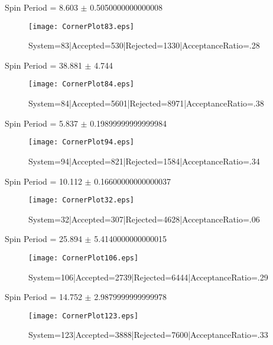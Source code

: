 \documentclass[10pt]{article}
\begin{document}
\begin{center}
        Spin Period = 8.603 $\pm$ 0.5050000000000008
        \end{center}
\begin{figure}[h] 
        \texttt{[image: CornerPlot83.eps]}
        \caption{System=83|Accepted=530|Rejected=1330|AcceptanceRatio=.28}
        \label{S83}
        \centering
        \end{figure}
\begin{center}
        Spin Period = 38.881 $\pm$ 4.744
        \end{center}
\begin{figure}[h] 
        \texttt{[image: CornerPlot84.eps]}
        \caption{System=84|Accepted=5601|Rejected=8971|AcceptanceRatio=.38}
        \label{S84}
        \centering
        \end{figure}
\begin{center}
        Spin Period = 5.837 $\pm$ 0.19899999999999984
        \end{center}
\begin{figure}[h] 
        \texttt{[image: CornerPlot94.eps]}
        \caption{System=94|Accepted=821|Rejected=1584|AcceptanceRatio=.34}
        \label{S94}
        \centering
        \end{figure}
\begin{center}
        Spin Period = 10.112 $\pm$ 0.16600000000000037
        \end{center}
\begin{figure}[h] 
        \texttt{[image: CornerPlot32.eps]}
        \caption{System=32|Accepted=307|Rejected=4628|AcceptanceRatio=.06}
        \label{S32}
        \centering
        \end{figure}
\begin{center}
        Spin Period = 25.894 $\pm$ 5.4140000000000015
        \end{center}
\begin{figure}[h] 
        \texttt{[image: CornerPlot106.eps]}
        \caption{System=106|Accepted=2739|Rejected=6444|AcceptanceRatio=.29}
        \label{S106}
        \centering
        \end{figure}
\begin{center}
        Spin Period = 14.752 $\pm$ 2.9879999999999978
        \end{center}
\begin{figure}[h] 
        \texttt{[image: CornerPlot123.eps]}
        \caption{System=123|Accepted=3888|Rejected=7600|AcceptanceRatio=.33}
        \label{S123}
        \centering
        \end{figure}
\end{document}
